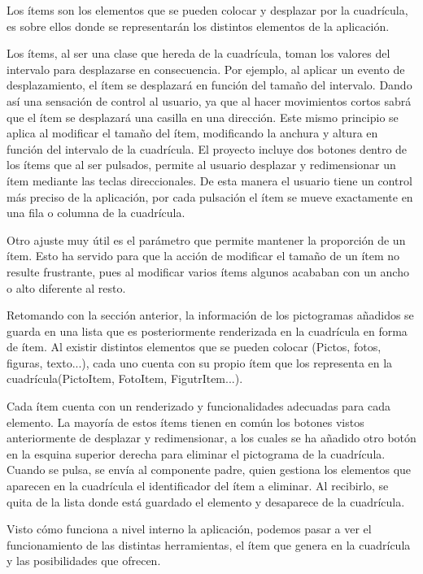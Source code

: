 Los ítems son los elementos que se pueden colocar y desplazar por la cuadrícula, es sobre ellos donde se representarán los distintos elementos de la aplicación. 

Los ítems, al ser una clase que hereda de la cuadrícula, toman los valores del intervalo para desplazarse en consecuencia. Por ejemplo, al aplicar un evento de desplazamiento, el ítem se desplazará en función del tamaño del intervalo. Dando así una sensación de control al usuario, ya que al hacer movimientos cortos sabrá que el ítem se desplazará una casilla en una dirección. Este mismo principio se aplica al modificar el tamaño del ítem, modificando la anchura y altura en función del intervalo de la cuadrícula. El proyecto incluye dos botones dentro de los ítems que al ser pulsados, permite al usuario desplazar y redimensionar un ítem mediante las teclas direccionales. De esta manera el usuario tiene un control más preciso de la aplicación, por cada pulsación el ítem se mueve exactamente en una fila o columna de la cuadrícula.

Otro ajuste muy útil es el parámetro que permite mantener la proporción de un ítem. Esto ha servido para que la acción de modificar el tamaño de un ítem no resulte frustrante, pues al modificar varios ítems algunos acababan con un ancho o alto diferente al resto.

Retomando con la sección anterior, la información de los pictogramas añadidos se guarda en una lista que es posteriormente renderizada en la cuadrícula en forma de ítem. Al existir distintos elementos que se pueden colocar (Pictos, fotos, figuras, texto...), cada uno cuenta con su propio  ítem que los representa en la cuadrícula(PictoItem, FotoItem, FigutrItem...). 

Cada ítem cuenta con un renderizado y funcionalidades adecuadas para cada elemento. La mayoría de estos ítems tienen en común los botones vistos anteriormente de desplazar y redimensionar, a los cuales se ha añadido otro botón en la esquina superior derecha para eliminar el pictograma de la cuadrícula. Cuando se pulsa, se envía al componente padre, quien gestiona los elementos que aparecen en la cuadrícula el identificador del ítem a eliminar. Al recibirlo, se quita de la lista donde está guardado el elemento y desaparece de la cuadrícula.

Visto cómo funciona a nivel interno la aplicación, podemos pasar a ver el funcionamiento de las distintas herramientas, el ítem que genera en la cuadrícula y las posibilidades que ofrecen. 

